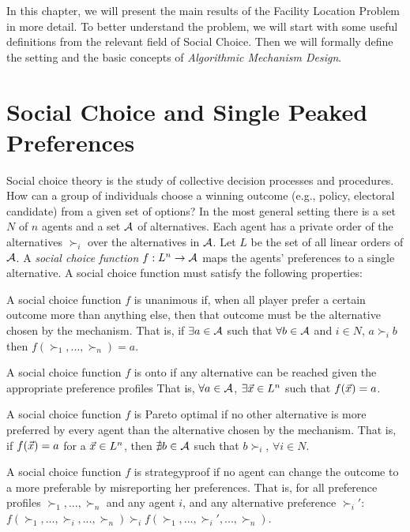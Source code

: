 
In this chapter, we will present the main results of the Facility Location Problem in more detail. To better understand the problem, we will start with some useful definitions from the relevant field of Social Choice. Then we will formally define the setting and the basic concepts of \emph{Algorithmic Mechanism Design}.

\section{Social Choice and Single Peaked Preferences}

Social choice theory is the study of collective decision processes and procedures. How can a group of individuals choose a winning outcome (e.g., policy, electoral candidate) from a given set of options? In the most general setting there is a set $N$ of $n$ agents and a set $\mathcal{A}$ of alternatives. Each agent has a private order of the alternatives $\succ_i$ over the alternatives in $\mathcal{A}$. Let $L$ be the set of all linear orders of $\mathcal{A}$. A \emph{social choice function} $f:L^n \rightarrow \mathcal{A}$ maps the agents' preferences to a single alternative. A social choice function must satisfy the following properties:
\begin{definition}[Unanimous]
A social choice function $f$ is unanimous if, when all player prefer a certain outcome more than anything else, then that outcome must be the alternative chosen by the mechanism. That is, if $\exists a \in\mathcal{A}$ such that $\forall b\in\mathcal{A}$ and $i \in  N$, $a \succ_i b$ then $f(\succ_1,...,\succ_n) =a$.
\end{definition}
\begin{definition}[Onto]
 A social choice function $f$ is onto if any alternative can be reached given the appropriate preference profiles That is, $\forall a \in\mathcal{A}$, $\exists \vec{x}\in L^n$ such that $f(\vec{x}) = a$.
\end{definition}
\begin{definition}
 A social choice function $f$ is Pareto optimal if no other alternative is more preferred by every agent than the alternative chosen by the mechanism. That is, if $f(\vec{x})=a$ for a $\vec{x}\in L^n$, then $\nexists b\in\mathcal{A}$ such that $b\succ_i$, $\forall i \in N$.
\end{definition}
\begin{definition}[Strategyproof]
A social choice function $f$ is strategyproof if no agent can change the outcome to a more preferable by misreporting her preferences. That is, for all preference profiles $\succ_1,...,\succ_n$ and any agent $i$, and any alternative preference $\succ_i'$: $f(\succ_1,...,\succ_i,...,\succ_n) \succ_i f(\succ_1,...,\succ_i',...,\succ_n)$.
\end{definition}

